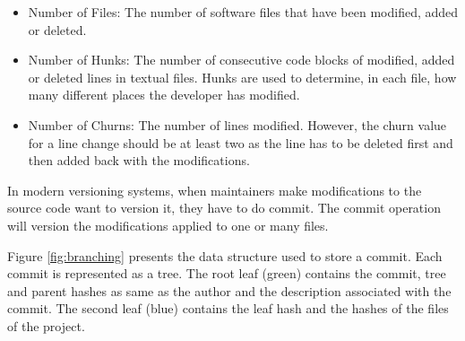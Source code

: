 \documentclass[natbib]{svjour3}
\providecommand{\tightlist}{%
  \setlength{\itemsep}{0pt}\setlength{\parskip}{0pt}}
\begin{document}
\begin{itemize}
\tightlist
\item
  Number of Files: The number of software files that have been modified,
  added or deleted.
\item
  Number of Hunks: The number of consecutive code blocks of modified,
  added or deleted lines in textual files. Hunks are used to determine,
  in each file, how many different places the developer has modified.
\item
  Number of Churns: The number of lines modified. However, the churn
  value for a line change should be at least two as the line has to be
  deleted first and then added back with the modifications.
\end{itemize}

In modern versioning systems, when maintainers make modifications to the
source code want to version it, they have to do commit. The commit
operation will version the modifications applied to one or many files.

Figure \ref{fig:branching} presents the data structure used to store a
commit. Each commit is represented as a tree. The root leaf (green)
contains the commit, tree and parent hashes as same as the author and
the description associated with the commit. The second leaf (blue)
contains the leaf hash and the hashes of the files of the project.
\end{document}

